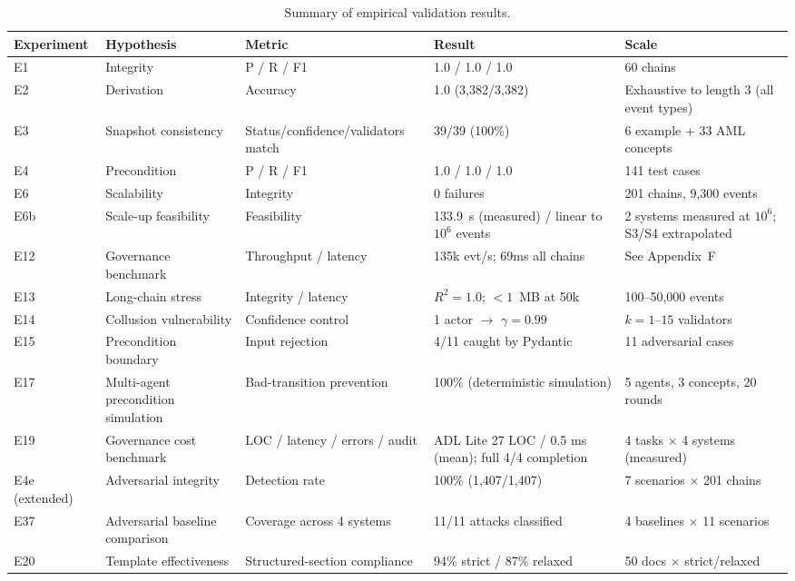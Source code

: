 \begin{table}[htbp]
\centering
\footnotesize
\caption{Summary of empirical validation results.}
\label{tab:results}
\begin{tabularx}{\textwidth}{@{}p{1.8cm}p{2.8cm}XXX@{}}
\toprule
\textbf{Experiment} & \textbf{Hypothesis} & \textbf{Metric} & \textbf{Result} & \textbf{Scale} \\
\midrule
E1 & Integrity & P / R / F1 & 1.0 / 1.0 / 1.0 & 60 chains \\
E2 & Derivation & Accuracy & 1.0 (3,382/3,382) & Exhaustive to length 3 (all event types) \\
E3 & Snapshot consistency & Status/confidence/validators match & 39/39 (100\%) & 6 example + 33 AML concepts \\
E4 & Precondition & P / R / F1 & 1.0 / 1.0 / 1.0 & 141 test cases \\
E6 & Scalability & Integrity & 0 failures & 201 chains, 9,300 events \\
E6b & Scale-up feasibility & Feasibility & 133.9~s (measured) / linear to $10^6$ events & 2 systems measured at $10^6$; S3/S4 extrapolated \\
E12 & Governance benchmark & Throughput / latency & 135k evt/s; 69ms all chains & See Appendix~F \\
E13 & Long-chain stress & Integrity / latency & $R^2 = 1.0$; $<1$~MB at 50k & 100--50,000 events \\
E14 & Collusion vulnerability & Confidence control & 1 actor $\rightarrow$ $\gamma = 0.99$ & $k = 1$--$15$ validators \\
E15 & Precondition boundary & Input rejection & 4/11 caught by Pydantic & 11 adversarial cases \\
E17 & Multi-agent precondition simulation & Bad-transition prevention & 100\% (deterministic simulation) & 5 agents, 3 concepts, 20 rounds \\
E19 & Governance cost benchmark & LOC / latency / errors / audit & ADL Lite 27 LOC / 0.5 ms (mean); full 4/4 completion & 4 tasks $\times$ 4 systems (measured) \\
E4e (extended) & Adversarial integrity & Detection rate & 100\% (1,407/1,407) & 7 scenarios $\times$ 201 chains \\
E37 & Adversarial baseline comparison & Coverage across 4 systems & 11/11 attacks classified & 4 baselines $\times$ 11 scenarios \\
E20 & Template effectiveness & Structured-section compliance & 94\% strict / 87\% relaxed & 50 docs $\times$ strict/relaxed \\

\end{tabularx}
\end{table}
